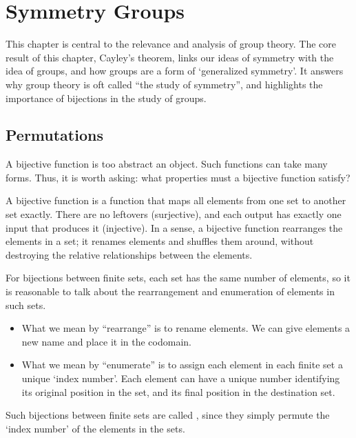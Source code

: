 \chapter{Symmetry Groups}
This chapter is central to the relevance and analysis of group theory. The core result of this chapter, Cayley's theorem, links our ideas of symmetry with the idea of groups, and how groups are a form of `generalized symmetry'. It answers why group theory is oft called ``the study of symmetry'', and highlights the importance of bijections in the study of groups.

\section{Permutations}
A bijective function is too abstract an object. Such functions can take many forms. Thus, it is worth asking: what properties must a bijective function satisfy?

A bijective function is a function that maps all elements from one set to another set exactly. There are no leftovers (surjective), and each output has exactly one input that produces it (injective). In a sense, a bijective function rearranges the elements in a set; it renames elements and shuffles them around, without destroying the relative relationships between the elements.

For bijections between finite sets, each set has the same number of elements, so it is reasonable to talk about the rearrangement and enumeration of elements in such sets.
\begin{itemize}
    \item What we mean by ``rearrange'' is to rename elements. We can give elements a new name and place it in the codomain.
    \item What we mean by ``enumerate'' is to assign each element in each finite set a unique `index number'. Each element can have a unique number identifying its original position in the set, and its final position in the destination set.
\end{itemize}

Such bijections between finite sets are called , since they simply permute the `index number' of the elements in the sets.

